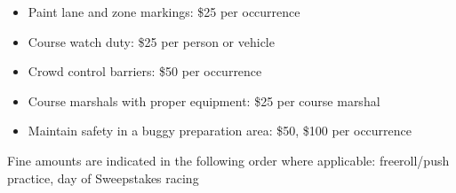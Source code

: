 \begin{appendices}
\begin{itemize}
			\item Paint lane and zone markings: \$25 per occurrence

			\item Course watch duty: \$25 per person or vehicle

			\item Crowd control barriers: \$50 per occurrence

			\item Course marshals with proper equipment: \$25 per course marshal
			
			\item Maintain safety in a buggy preparation area: \$50, \$100 per occurrence

		\end{itemize}

		\noindent Fine amounts are indicated in the following order where applicable: \newline
		freeroll/push practice, day of Sweepstakes racing
\end{appendices}
